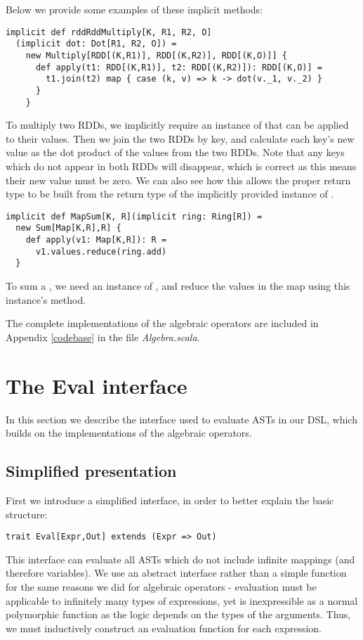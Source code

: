 Below we provide some examples of these implicit methods:
\vs\begin{lstlisting}
implicit def rddRddMultiply[K, R1, R2, O]
  (implicit dot: Dot[R1, R2, O]) =
    new Multiply[RDD[(K,R1)], RDD[(K,R2)], RDD[(K,O)]] {
      def apply(t1: RDD[(K,R1)], t2: RDD[(K,R2)]): RDD[(K,O)] = 
        t1.join(t2) map { case (k, v) => k -> dot(v._1, v._2) }
      }
    }
\end{lstlisting}\vs
To multiply two RDDs, we implicitly require an instance of  that can be applied to their values. Then we join the two RDDs by key, and calculate each key's new value as the dot product of the values from the two RDDs. Note that any keys which do not appear in both RDDs will disappear, which is correct as this means their new value must be zero. We can also see how this allows the proper return type to be built from the return type  of the implicitly provided instance of .
\vs\begin{lstlisting}
implicit def MapSum[K, R](implicit ring: Ring[R]) =
  new Sum[Map[K,R],R] {
    def apply(v1: Map[K,R]): R =
      v1.values.reduce(ring.add)
  }
\end{lstlisting}\vs
To sum a , we need an instance of , and reduce the values in the map using this instance's  method.

The complete implementations of the algebraic operators are included in Appendix \ref{codebase} in the file \textit{Algebra.scala}.

\section{The Eval interface}
In this section we describe the interface used to evaluate ASTs in our DSL, which builds on the implementations of the algebraic operators.
\subsection{Simplified presentation}
First we introduce a simplified interface, in order to better explain the basic structure:
\begin{lstlisting}
trait Eval[Expr,Out] extends (Expr => Out)
\end{lstlisting}
This interface can evaluate all ASTs which do not include infinite mappings (and therefore variables). We use an abstract interface rather than a simple function for the same reasons we did for algebraic operators - evaluation must be applicable to infinitely many types of expressions, yet is inexpressible as a normal polymorphic function as the logic depends on the types of the arguments. Thus, we must inductively construct an evaluation function for each expression.

